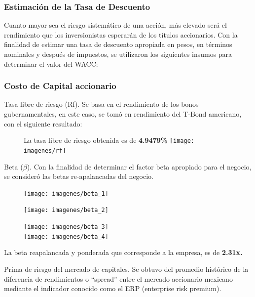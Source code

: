 \subsubsection{Estimaci\'on de la Tasa de Descuento}

Cuanto mayor sea el riesgo sistem\'atico de una acci\'on, m\'as elevado ser\'a el rendimiento que los inversionistas esperar\'an de los t\'itulos accionarios. Con la finalidad de estimar una tasa de descuento apropiada en pesos, en t\'erminos nominales y despu\'es de impuestos, se utilizaron los siguientes insumos para determinar el valor del WACC:

\subsubsection{Costo de Capital accionario}

\textcolor{principal}{Tasa libre de riesgo (Rf).} Se basa en el rendimiento de los bonos gubernamentales, en este caso, se tom\'o en rendimiento del T-Bond americano, con el siguiente resultado:

\begin{figure}[H]
\centering
La tasa libre de riesgo obtenida es de \textbf{4.9479\%} \texttt{[image: imagenes/rf]}
\end{figure}

\textcolor{principal}{Beta ($\beta$)}. Con la finalidad de determinar el factor beta apropiado para el negocio, se consider\'o las betas re-apalancadas del negocio.\\

\begin{figure}[H]
\centering
\texttt{[image: imagenes/beta\_1]}\\
\end{figure}
\begin{figure}[H]
\centering
\texttt{[image: imagenes/beta\_2]}
\end{figure}
\espacio{3cm}
\begin{figure}[H]
\centering
\texttt{[image: imagenes/beta\_3]}\\
\texttt{[image: imagenes/beta\_4]}
\end{figure}

La beta reapalancada y ponderada que corresponde a la empresa, es de \textcolor{principal}{\textbf{2.31x.}}

\espacio{1cm}



\textcolor{principal}{Prima de riesgo del mercado de capitales}. Se obtuvo del promedio hist\'orico de la diferencia de rendimientos o ``spread'' entre el mercado accionario mexicano mediante el indicador conocido como el ERP (enterprise risk premium).\\

